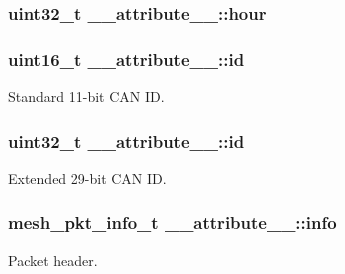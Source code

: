 \subsubsection[{\texorpdfstring{hour}{hour}}]{\setlength{\rightskip}{0pt plus 5cm}uint32\+\_\+t \+\_\+\+\_\+attribute\+\_\+\+\_\+\+::hour}\hypertarget{struct____attribute_____a226a28214916e63e3be8b34a904a6fe5}{}\label{struct____attribute_____a226a28214916e63e3be8b34a904a6fe5}
\subsubsection[{\texorpdfstring{id}{id}}]{\setlength{\rightskip}{0pt plus 5cm}uint16\+\_\+t \+\_\+\+\_\+attribute\+\_\+\+\_\+\+::id}\hypertarget{struct____attribute_____ad3ca970dad0c3c0dde583a1916245292}{}\label{struct____attribute_____ad3ca970dad0c3c0dde583a1916245292}


Standard 11-\/bit C\+AN ID. 

\subsubsection[{\texorpdfstring{id}{id}}]{\setlength{\rightskip}{0pt plus 5cm}uint32\+\_\+t \+\_\+\+\_\+attribute\+\_\+\+\_\+\+::id}\hypertarget{struct____attribute_____a87df1990d2a726a8feb9ee5d5fd158d2}{}\label{struct____attribute_____a87df1990d2a726a8feb9ee5d5fd158d2}


Extended 29-\/bit C\+AN ID. 

\subsubsection[{\texorpdfstring{info}{info}}]{\setlength{\rightskip}{0pt plus 5cm}mesh\+\_\+pkt\+\_\+info\+\_\+t \+\_\+\+\_\+attribute\+\_\+\+\_\+\+::info}\hypertarget{struct____attribute_____a12c2cc9433afd67e97b7de65d9d58735}{}\label{struct____attribute_____a12c2cc9433afd67e97b7de65d9d58735}


Packet header. 

